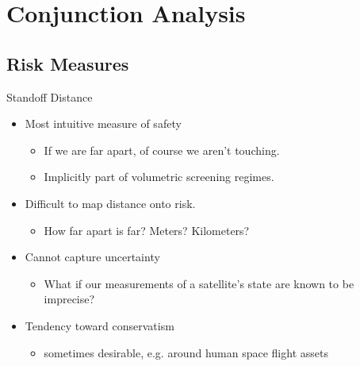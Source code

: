\documentclass[pdf]{beamer}
\begin{document}
\section{Conjunction Analysis}
\subsection{Risk Measures}

\begin{frame}{Standoff Distance}
  \begin{itemize}
  \item Most intuitive measure of safety
    \begin{itemize}
    \item If we are far apart, of course we aren't touching.
    \item Implicitly part of volumetric screening regimes.
    \end{itemize}

  \item Difficult to map distance onto risk.
    \begin{itemize}
    \item How far apart is far? Meters? Kilometers?
    \end{itemize}
    
  \item Cannot capture uncertainty
    \begin{itemize}
    \item What if our measurements of a satellite's state are known to be imprecise?
    \end{itemize}
    
  \item Tendency toward conservatism
    \begin{itemize}
      \item sometimes desirable, e.g. around human space flight assets
    \end{itemize}
  \end{itemize}
\end{frame}
\end{document}
